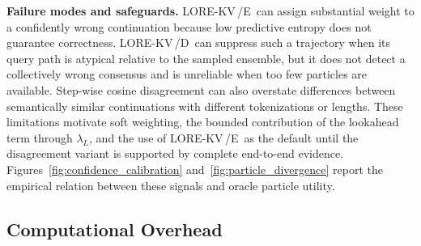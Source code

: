 \documentclass{article} %
\newcommand{\lorekvE}{LORE-KV\,/E}
\newcommand{\lorekvD}{LORE-KV\,/D}
\begin{document}
\textbf{Failure modes and safeguards.}
\lorekvE\ can assign substantial weight to a confidently wrong continuation because low predictive entropy does not guarantee correctness. \lorekvD\ can suppress such a trajectory when its query path is atypical relative to the sampled ensemble, but it does not detect a collectively wrong consensus and is unreliable when too few particles are available. Step-wise cosine disagreement can also overstate differences between semantically similar continuations with different tokenizations or lengths. These limitations motivate soft weighting, the bounded contribution of the lookahead term through $\lambda_L$, and the use of \lorekvE\ as the default until the disagreement variant is supported by complete end-to-end evidence. Figures~\ref{fig:confidence_calibration} and~\ref{fig:particle_divergence} report the empirical relation between these signals and oracle particle utility.

\subsection{Computational Overhead} \label{app:overhead_details}
\end{document}
